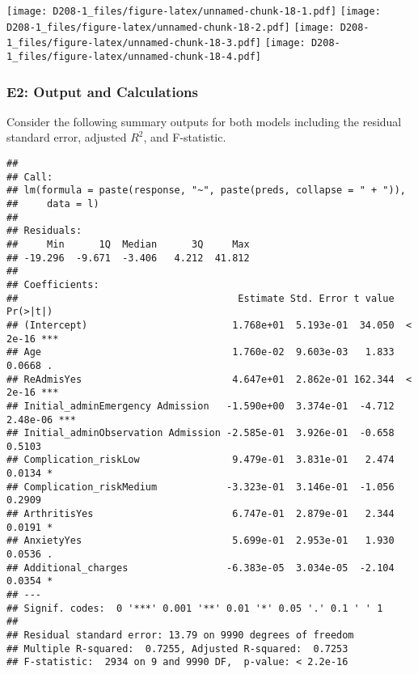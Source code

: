 \documentclass[
]{article}
\newenvironment{Shaded}{\begin{snugshade}}{\end{snugshade}}
\newcommand{\CommentTok}[1]{\textcolor[rgb]{0.56,0.35,0.01}{\textit{#1}}}
\newcommand{\FunctionTok}[1]{\textcolor[rgb]{0.00,0.00,0.00}{#1}}
\newcommand{\NormalTok}[1]{#1}
\newcommand{\SpecialCharTok}[1]{\textcolor[rgb]{0.00,0.00,0.00}{#1}}
\begin{document}
\texttt{[image: D208-1\_files/figure-latex/unnamed-chunk-18-1.pdf]}
\texttt{[image: D208-1\_files/figure-latex/unnamed-chunk-18-2.pdf]}
\texttt{[image: D208-1\_files/figure-latex/unnamed-chunk-18-3.pdf]}
\texttt{[image: D208-1\_files/figure-latex/unnamed-chunk-18-4.pdf]}

\hypertarget{e2-output-and-calculations}{%
\subsubsection{E2: Output and
Calculations}\label{e2-output-and-calculations}}

Consider the following summary outputs for both models including the
residual standard error, adjusted \(R^2\), and F-statistic.

\begin{Shaded}
\end{Shaded}

\begin{verbatim}
## 
## Call:
## lm(formula = paste(response, "~", paste(preds, collapse = " + ")), 
##     data = l)
## 
## Residuals:
##     Min      1Q  Median      3Q     Max 
## -19.296  -9.671  -3.406   4.212  41.812 
## 
## Coefficients:
##                                      Estimate Std. Error t value Pr(>|t|)    
## (Intercept)                         1.768e+01  5.193e-01  34.050  < 2e-16 ***
## Age                                 1.760e-02  9.603e-03   1.833   0.0668 .  
## ReAdmisYes                          4.647e+01  2.862e-01 162.344  < 2e-16 ***
## Initial_adminEmergency Admission   -1.590e+00  3.374e-01  -4.712 2.48e-06 ***
## Initial_adminObservation Admission -2.585e-01  3.926e-01  -0.658   0.5103    
## Complication_riskLow                9.479e-01  3.831e-01   2.474   0.0134 *  
## Complication_riskMedium            -3.323e-01  3.146e-01  -1.056   0.2909    
## ArthritisYes                        6.747e-01  2.879e-01   2.344   0.0191 *  
## AnxietyYes                          5.699e-01  2.953e-01   1.930   0.0536 .  
## Additional_charges                 -6.383e-05  3.034e-05  -2.104   0.0354 *  
## ---
## Signif. codes:  0 '***' 0.001 '**' 0.01 '*' 0.05 '.' 0.1 ' ' 1
## 
## Residual standard error: 13.79 on 9990 degrees of freedom
## Multiple R-squared:  0.7255, Adjusted R-squared:  0.7253 
## F-statistic:  2934 on 9 and 9990 DF,  p-value: < 2.2e-16
\end{verbatim}
\end{document}
